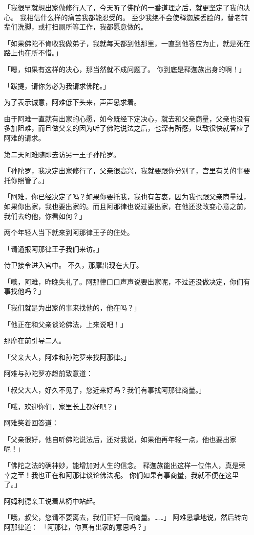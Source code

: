 \documentclass[twoside,openany]{book}
\begin{document}
「我很早就想出家做修行人了，今天听了佛陀的一番道理之后，就更坚定了我的决心。
我相信什么样的痛苦我都能忍受的。
至少我绝不会使释迦族丢脸的，替老前辈们洗脚，或打扫厕所等工作，我都愿意做的。

「如果佛陀不肯收我做弟子，我就每天都到他那里，一直到他答应为止，就是死在路上也在所不惜。」

「嗯，如果有这样的决心，那当然就不成问题了。
你到底是释迦族出身的啊！」

「跋提，请你务必为我请求佛陀。」

为了表示诚意，阿难低下头来，声声恳求着。

由于阿难一直就有出家的心愿，如今既经下定决心，就去和父亲商量，父亲也没有多加阻难，而且做父亲的因为听了佛陀说法之后，也深有所感，以致很快就答应了阿难的请求。

第二天阿难随即去访另一王子孙陀罗。

「孙陀罗，我决定出家修行了，父亲很高兴，我就要跟你分别了，宫里有关的事要托你照管了。」

「阿难，你已经决定了吗？如果你要托我，我也有苦衷，因为我也跟父亲商量过，如果你出家，我也要出家的。而且阿那律也说过要出家，在他还没改变心意之前，我们去约他，你看如何？」

两个年轻人当下就来到阿那律王子的住处。

「请通报阿那律王子我们来访。」

侍卫接令进入宫中。
不久，那摩出现在大厅。

「噢，阿难，昨晚失礼了。阿那律口口声声说要出家呢，不过还没做决定，你们有事找他吗？」

「我们就是为出家的事来找他的，他在吗？」

「他正在和父亲谈论佛法，上来说吧！」

那摩在前引导二人。

「父亲大人，阿难和孙陀罗来找阿那律。」

阿难与孙陀罗亦趋前致意道：

「叔父大人，好久不见了，您近来好吗？我们有事找阿那律商量。」

「哦，欢迎你们，家里长上都好吧？」

阿难笑着回答道：

「父亲很好，他自听佛陀说法后，还对我说，如果他再年轻一点，他也要出家呢！」

「佛陀之法的确神妙，能增加对人生的信念。
释迦族能出这样一位伟人，真是荣幸之至！我也正在和阿那律谈论佛法呢。
你们如果有事商量，我就不便在这里了。」

阿姆利德亲王说着从椅中站起。

「哦，叔父，您请不要离去，我们正好一同商量。……」
阿难恳挚地说，然后转向阿那律道：
「阿那律，你真有出家的意思吗？」
\end{document}
